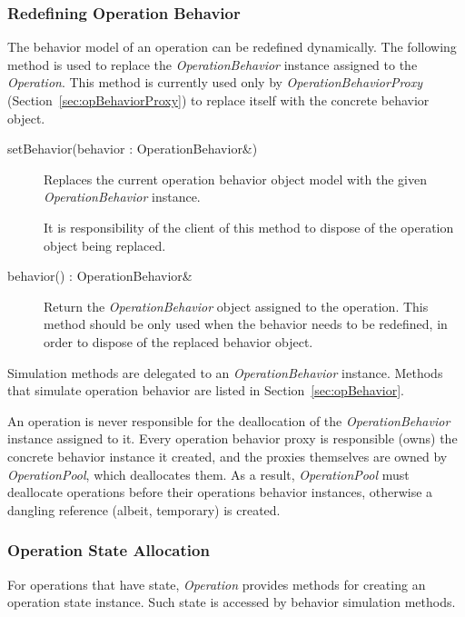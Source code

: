 \documentclass[a4paper,twoside]{tce}
\begin{document}
\subsubsection{Redefining Operation Behavior}

The behavior model of an operation can be redefined dynamically.  The
following method is used to replace the \emph{OperationBehavior} instance
assigned to the \emph{Operation}.  This method is currently used only by
\emph{OperationBehaviorProxy} (Section~\ref{sec:opBehaviorProxy}) to replace
itself with the concrete behavior object.

\begin{description}
\item[setBehavior(behavior : OperationBehavior\&)]%

  Replaces the current operation behavior object model with the given
  \emph{OperationBehavior} instance.

  It is responsibility of the client of this method to dispose of the
  operation object being replaced.

\item[behavior() : OperationBehavior\&]%

  Return the \emph{OperationBehavior} object assigned to the operation.
  This method should be only used when the behavior needs to be redefined,
  in order to dispose of the replaced behavior object.

\end{description}

Simulation methods are delegated to an \emph{OperationBehavior} instance.
Methods that simulate operation behavior are listed in
Section~\ref{sec:opBehavior}.

An operation is never responsible for the deallocation of the
\emph{OperationBehavior} instance assigned to it.  Every operation behavior
proxy is responsible (owns) the concrete behavior instance it created, and
the proxies themselves are owned by \emph{OperationPool}, which deallocates
them.  As a result, \emph{OperationPool} must deallocate operations before
their operations behavior instances, otherwise a dangling reference
(albeit, temporary) is created.

\subsubsection{Operation State Allocation}

For operations that have state, \emph{Operation} provides methods for
creating an operation state instance.  Such state is accessed by behavior
simulation methods.
\end{document}
